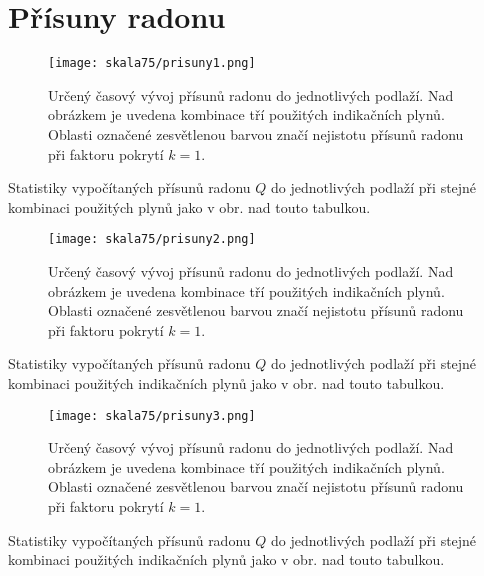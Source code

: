 \section{Přísuny radonu}

\begin{figure}[H]
    \centering
    \texttt{[image: skala75/prisuny1.png]}
    \caption{Určený časový vývoj přísunů radonu do jednotlivých podlaží. Nad obrázkem je uvedena kombinace tří použitých indikačních plynů. Oblasti označené zesvětlenou barvou značí nejistotu přísunů radonu při faktoru pokrytí $k=1$.}
    \label{fig:skala75_prisuny1}
\end{figure}
\begin{table}[H]
    \centering
    \caption{Statistiky vypočítaných přísunů radonu $Q$ do jednotlivých podlaží při stejné kombinaci použitých plynů jako v obr. nad touto tabulkou.}
    \label{tab:skala75_prisuny1}
    
\end{table}

\begin{figure}[H]
    \centering
    \texttt{[image: skala75/prisuny2.png]}
    \caption{Určený časový vývoj přísunů radonu do jednotlivých podlaží. Nad obrázkem je uvedena kombinace tří použitých indikačních plynů. Oblasti označené zesvětlenou barvou značí nejistotu přísunů radonu při faktoru pokrytí $k=1$.}
    \label{fig:skala75_prisuny2}
\end{figure}
\begin{table}[H]
    \centering
    \caption{Statistiky vypočítaných přísunů radonu $Q$ do jednotlivých podlaží při stejné kombinaci použitých indikačních plynů jako v obr. nad touto tabulkou.}
    \label{tab:skala75_prisuny2}
    
\end{table}

\begin{figure}[H]
    \centering
    \texttt{[image: skala75/prisuny3.png]}
    \caption{Určený časový vývoj přísunů radonu do jednotlivých podlaží. Nad obrázkem je uvedena kombinace tří použitých indikačních plynů. Oblasti označené zesvětlenou barvou značí nejistotu přísunů radonu při faktoru pokrytí $k=1$.}
    \label{fig:skala75_prisuny3}
\end{figure}
\begin{table}[H]
    \centering
    \caption{Statistiky vypočítaných přísunů radonu $Q$ do jednotlivých podlaží při stejné kombinaci použitých indikačních plynů jako v obr. nad touto tabulkou.}
    \label{tab:skala75_prisuny3}
    
\end{table}

